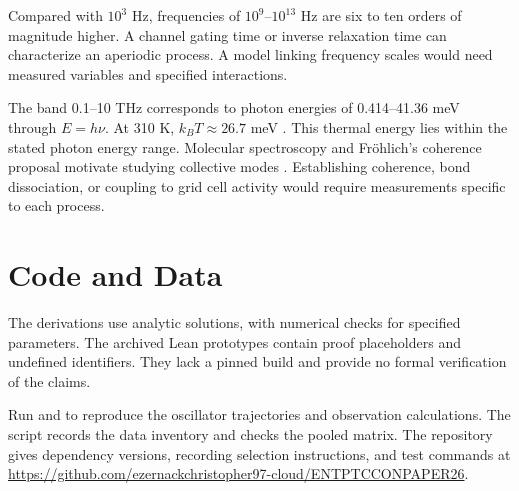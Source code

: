 \documentclass[12pt,a4paper]{article}
\begin{document}
Compared with $10^3$ Hz, frequencies of $10^9$--$10^{13}$ Hz are six to ten orders of magnitude higher. A channel gating time or inverse relaxation time can characterize an aperiodic process. A model linking frequency scales would need measured variables and specified interactions.

The band 0.1--10 THz corresponds to photon energies of 0.414--41.36 meV through $E=h\nu$. At 310 K, $k_BT\approx26.7$ meV \cite{NISTConstants}. This thermal energy lies within the stated photon energy range. Molecular spectroscopy and Fr\"ohlich's coherence proposal motivate studying collective modes \cite{Markelz2008,Frohlich1968}. Establishing coherence, bond dissociation, or coupling to grid cell activity would require measurements specific to each process.

\section{Code and Data}\label{sec:lean}\label{app:lean}

The derivations use analytic solutions, with numerical checks for specified parameters. The archived Lean prototypes contain proof placeholders and undefined identifiers. They lack a pinned build and provide no formal verification of the claims.

Run  and  to reproduce the oscillator trajectories and observation calculations. The script  records the data inventory and checks the pooled matrix. The repository gives dependency versions, recording selection instructions, and test commands at \url{https://github.com/ezernackchristopher97-cloud/ENTPTCCONPAPER26}.

\begingroup
\singlespacing
\setlength{\bibsep}{3pt}


\endgroup
\end{document}
